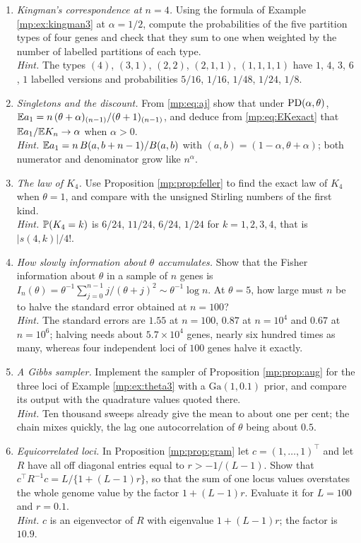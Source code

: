 \begin{enumerate}[leftmargin=1.8em,itemsep=4pt,label=\arabic*.]
\item \emph{Kingman's correspondence at $n=4$.} Using the formula of Example
\ref{mp:ex:kingman3} at $\alpha=1/2$, compute the probabilities of the five partition types
of four genes and check that they sum to one when weighted by the number of labelled
partitions of each type.\\
\emph{Hint.} The types $(4)$, $(3,1)$, $(2,2)$, $(2,1,1)$, $(1,1,1,1)$ have $1$, $4$, $3$, $6$,
$1$ labelled versions and probabilities $5/16$, $1/16$, $1/48$, $1/24$, $1/8$.

\item \emph{Singletons and the discount.} From \eqref{mp:eq:aj} show that under
$\mathrm{PD}(\alpha,\theta)$, $\mathbb{E} a_1=n\,(\theta+\alpha)_{(n-1)}/(\theta+1)_{(n-1)}$, and deduce from
\eqref{mp:eq:EKexact} that $\mathbb{E} a_1/\mathbb{E} K_n\to\alpha$ when $\alpha>0$.\\
\emph{Hint.} $\mathbb{E} a_1=n\,B(a,b+n-1)/B(a,b)$ with $(a,b)=(1-\alpha,\theta+\alpha)$; both
numerator and denominator grow like $n^\alpha$.

\item \emph{The law of $K_4$.} Use Proposition \ref{mp:prop:feller} to find the exact law of
$K_4$ when $\theta=1$, and compare with the unsigned Stirling numbers of the first kind.\\
\emph{Hint.} $\mathbb{P}(K_4=k)$ is $6/24$, $11/24$, $6/24$, $1/24$ for $k=1,2,3,4$, that is
$|s(4,k)|/4!$.

\item \emph{How slowly information about $\theta$ accumulates.} Show that the Fisher
information about $\theta$ in a sample of $n$ genes is
$I_n(\theta)=\theta^{-1}\sum_{j=0}^{n-1}j/(\theta+j)^2\sim\theta^{-1}\log n$. At $\theta=5$,
how large must $n$ be to halve the standard error obtained at $n=100$?\\
\emph{Hint.} The standard errors are $1.55$ at $n=100$, $0.87$ at $n=10^4$ and $0.67$ at
$n=10^6$; halving needs about $5.7\times10^4$ genes, nearly six hundred times as many, whereas
four independent loci of $100$ genes halve it exactly.

\item \emph{A Gibbs sampler.} Implement the sampler of Proposition \ref{mp:prop:aug} for the
three loci of Example \ref{mp:ex:theta3} with a $\mathrm{Ga}(1,0.1)$ prior, and compare its
output with the quadrature values quoted there.\\
\emph{Hint.} Ten thousand sweeps already give the mean to about one per cent; the chain mixes
quickly, the lag one autocorrelation of $\theta$ being about $0.5$.

\item \emph{Equicorrelated loci.} In Proposition \ref{mp:prop:gram} let $c=(1,\dots,1)^\top$ and
let $R$ have all off diagonal entries equal to $r>-1/(L-1)$. Show that
$c^\top R^{-1}c=L/\{1+(L-1)r\}$, so that the sum of one locus values overstates the whole
genome value by the factor $1+(L-1)r$. Evaluate it for $L=100$ and $r=0.1$.\\
\emph{Hint.} $c$ is an eigenvector of $R$ with eigenvalue $1+(L-1)r$; the factor is $10.9$.
\end{enumerate}

